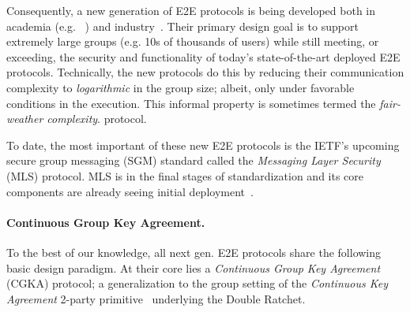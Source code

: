 Consequently, a new generation of E2E protocols is being developed both in
academia (e.g.~%
\cite{CCS:CCGMM18,EC:AlwCorDod19,TCC:ACJM20,EPRINT:AlwJosMul20,C:ACDT20,TCC:AABNKPPW21,SP:ACC+21,hashimoto2021cmpke})
and industry~\cite{MLS}. Their primary design goal is to support extremely
large groups (e.g. 10s of thousands of users) while still meeting, or
exceeding, the security and functionality of today's state-of-the-art
deployed E2E protocols. Technically, the new protocols do this by reducing
their communication complexity to \emph{logarithmic} in the group size;
albeit, only under favorable conditions in the execution. This informal
property is sometimes termed the \emph{fair-weather complexity}. %
protocol.

To date, the most important of these new E2E protocols is the IETF's upcoming
secure group messaging (SGM) standard called the \emph{Messaging Layer
Security} (MLS) protocol.
MLS is in the final stages of standardization and its core
components are already seeing initial deployment~\cite{Cisco-Webex-MLS}.

\paragraph{Continuous Group Key Agreement.}
To the best of our knowledge, all next gen. E2E protocols share the following
basic design paradigm. At their core lies a \emph{Continuous Group Key
Agreement} (CGKA) protocol; a generalization to the group setting of the
\emph{Continuous Key Agreement} 2-party
primitive~\cite{EC:AlwCorDod19,CSCML:DG19} underlying the Double Ratchet.

